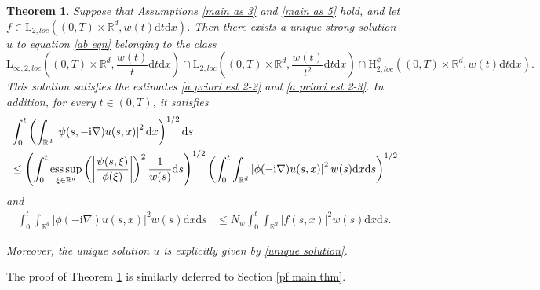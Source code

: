 \documentclass[11pt,reqno]{amsart}
\newtheorem{thm}{Theorem}[section]
\theoremstyle{definition}
\theoremstyle{remark}
\newcommand\bR{\mathbb{R}}
\DeclareMathOperator*{\esssup}{ess\,sup}
\numberwithin{equation}{section}
\begin{document}
\begin{thm}
							\label{main thm 3}
Suppose that Assumptions \ref{main as 3} and \ref{main as 5} hold, and let $f \in \mathrm{L}_{2,loc}\left( (0,T) \times \bR^d, w(t)\mathrm{d}t\mathrm{d}x \right)$. 
Then there exists a unique strong solution $u$ to equation \eqref{ab eqn} belonging to the class
$$
\mathrm{L}_{\infty,2, loc}\left( (0,T) \times \bR^d ,\frac{w(t)}{t}\mathrm{d}t \mathrm{d}x\right) \cap \mathrm{L}_{2, loc}\left( (0,T) \times \bR^d,\frac{w(t)}{t^2}\mathrm{d}t\mathrm{d}x \right) \cap \mathrm{H}_{2,loc}^{\phi}\left( (0,T) \times \bR^d, w(t)\mathrm{d}t\mathrm{d}x \right).
$$
This solution satisfies the estimates \eqref{a priori est 2-2} and \eqref{a priori est 2-3}. In addition, for every $t \in (0,T)$, it satisfies
\begin{align}
									\notag
&\int_0^t \left( \int_{\bR^d}  \left| \psi(s,-\mathrm{i}\nabla) u(s,x) \right|^2 \mathrm{d}x  \right)^{1/2} \mathrm{d}s \\
									\label{a priori est 00}
&\leq  \left(\int_0^t  \esssup_{\xi \in \bR^d} \left(\left| \frac{\psi(s,\xi)}{\phi(\xi)} \right|\right)^2 \frac{1}{w(s)} \mathrm{d}s \right)^{1/2} \left(\int_0^t \int_{\bR^d} \left|\phi(-\mathrm{i}\nabla)u(s,x)\right|^2 w(s)\mathrm{d}x\mathrm{d}s\right)^{1/2}
\end{align}
and
\begin{align}
 \int_0^t \int_{\bR^d} \left|\phi(-\mathrm{i}\nabla)u(s,x)\right|^2 w(s)\mathrm{d}x\mathrm{d}s 
									\label{a priori est}
&\leq N_w\int_0^t \int_{\bR^d}|f(s,x)|^2 w(s) \mathrm{d}x\mathrm{d}s.
\end{align}

Moreover, the unique solution $u$ is explicitly given by \eqref{unique solution}.



\end{thm}

The proof of Theorem \ref{main thm 3} is similarly deferred to Section \ref{pf main thm}.
\end{document}
